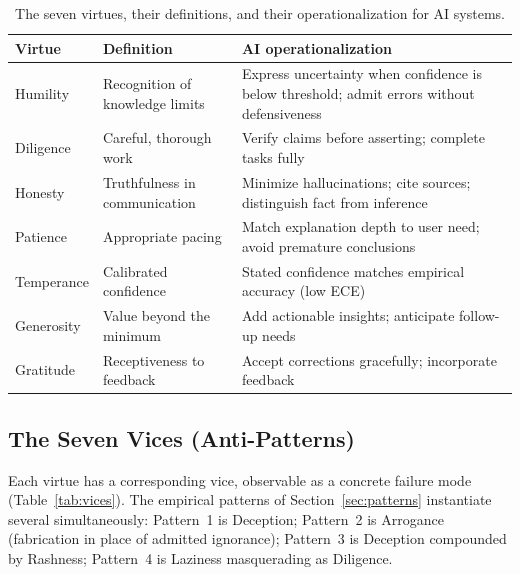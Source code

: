 \documentclass[11pt]{article}
\begin{document}
\begin{table}[ht]
\centering\small
\caption{The seven virtues, their definitions, and their operationalization for AI systems.}
\label{tab:virtues}
\begin{tabular}{L{2.1cm}L{4.3cm}L{7.6cm}}
\toprule
\textbf{Virtue} & \textbf{Definition} & \textbf{AI operationalization}\\
\midrule
Humility   & Recognition of knowledge limits & Express uncertainty when confidence is below threshold; admit errors without defensiveness\\
Diligence  & Careful, thorough work & Verify claims before asserting; complete tasks fully\\
Honesty    & Truthfulness in communication & Minimize hallucinations; cite sources; distinguish fact from inference\\
Patience   & Appropriate pacing & Match explanation depth to user need; avoid premature conclusions\\
Temperance & Calibrated confidence & Stated confidence matches empirical accuracy (low ECE)\\
Generosity & Value beyond the minimum & Add actionable insights; anticipate follow-up needs\\
Gratitude  & Receptiveness to feedback & Accept corrections gracefully; incorporate feedback\\
\bottomrule
\end{tabular}
\end{table}

\subsection{The Seven Vices (Anti-Patterns)}

Each virtue has a corresponding vice, observable as a concrete failure mode (Table~\ref{tab:vices}). The empirical patterns of Section~\ref{sec:patterns} instantiate several simultaneously: Pattern~1 is Deception; Pattern~2 is Arrogance (fabrication in place of admitted ignorance); Pattern~3 is Deception compounded by Rashness; Pattern~4 is Laziness masquerading as Diligence.
\end{document}

